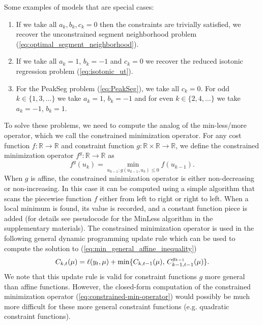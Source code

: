 \documentclass[aoas]{imsart}
\newcommand{\RR}{\mathbb R}
\begin{document}
Some examples of models that are special cases:
\begin{enumerate}
\item If we take all $a_k,b_k,c_k=0$ then the constraints are
  trivially satisfied, we
  recover the unconstrained segment neighborhood problem
  (\ref{eq:optimal_segment_neighborhood}).
\item If we take all $a_{k} =1$, $b_{k}=-1$ and $c_{k} = 0$ we recover
  the reduced isotonic regression problem
  (\ref{eq:isotonic_ut}).
\item For the PeakSeg problem (\ref{eq:PeakSeg}),
  we take all $c_{k} = 0$. For odd $k\in\{1,3,\dots\}$ we take
  $a_{k} =1$, $b_{k}=-1$ and for even $k\in\{2,4,\dots\}$ we take
  $a_{k} =-1$, $b_{k}=1$.
\end{enumerate}
To solve these problems, we need to compute the analog of the
min-less/more operator, which we call the constrained minimization
operator. For any cost function $f:\RR\rightarrow\RR$ and constraint
function $g:\RR\times\RR\rightarrow\RR$, we define the constrained
minimization operator $f^g:\RR\rightarrow\RR$ as
\begin{equation}
  \label{eq:constrained-min-operator}
  f^g(u_{k}) = \min_{u_{k-1} : g(u_{k-1}, u_{k})\leq 0} f(u_{k-1}).
\end{equation}
When $g$ is affine, the constrained minimization operator is either
non-decreasing or non-increasing. In this case it can be computed
using a simple algorithm that scans the piecewise function $f$ either
from left to right or right to left. When a local minimum is found,
its value is recorded, and a constant function piece is added (for
details see pseudocode for the MinLess algorithm in
the supplementary materials). The constrained minimization operator is
used in the following general dynamic programming update rule which
can be used to compute the solution to
(\ref{eq:min_general_affine_inequality})
\begin{equation}
  \label{eq:general_dp}
  \FCC_{k,t}(\mu) = \ell(y_t,\mu) + \min\{
  \FCC_{k,t-1}(\mu),\,
  \FCC_{k-1,t-1}^{g_{k-1}}(\mu)
  \}.
\end{equation}
We note that this update rule is valid for constraint functions $g$
more general than affine functions. However, the
closed-form computation of the constrained minimization operator
(\ref{eq:constrained-min-operator}) would possibly be much more
difficult for these more general constraint functions (e.g. quadratic
constraint functions).
\end{document}
